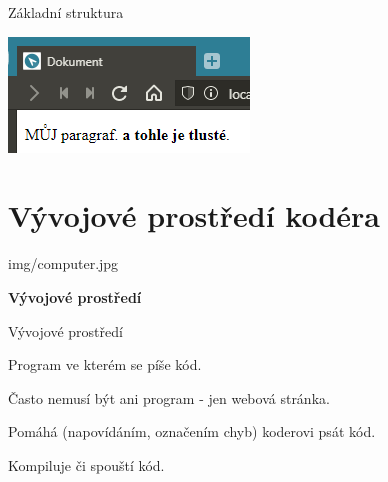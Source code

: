 \documentclass[aspectratio=169]{beamer}
\begin{document}
\begin{frame}{Základní struktura}
    \begin{center}
        \includegraphics[width=\textwidth]{img/html-6-render.png}
    \end{center}
\end{frame}


\section{Vývojové prostředí kodéra}

\begin{frameImg}[width]{img/computer.jpg}
    \vspace*{60mm}
    \begin{cardTiny}
        \vspace*{\fill}
        \begin{center}
            \textbf{Vývojové prostředí}
        \end{center}
    \end{cardTiny}
\end{frameImg}

\begin{frame}{Vývojové prostředí}
    \begin{cardTiny}
        \begin{flushleft}
            Program ve kterém se píše kód.

            Často nemusí být ani program - jen webová stránka.

            Pomáhá (napovídáním, označením chyb) koderovi psát kód.

            Kompiluje či spouští kód.
        \end{flushleft}
    \end{cardTiny}
\end{frame}
\end{document}
